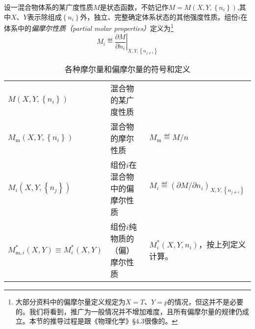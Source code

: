 \documentclass[main.tex]{subfiles}
\begin{document}
设一混合物体系的某广度性质$M$是状态函数，不妨记作$M=M\left(X,Y,\left\{n_i\right\}\right)$,其中$X$、$Y$表示除组成$\left\{n_i\right\}$外，独立、完整确定体系状态的其他强度性质。组份$i$在体系中的\emph{偏摩尔性质（partial molar properties）}定义为\footnote{大部分资料中的偏摩尔量定义规定为$X=T$、$Y=p$的情况，但这并不是必要的。我们将看到，推广为一般情况并不增加难度，且所有偏摩尔量的规律仍成立。本节的推导过程是跟《物理化学》\S4.3很像的。}
\[M_i\eqdef\left.\frac{\partial M}{\partial n_i}\right|_{X,Y,\left\{n_{j\neq i}\right\}}\]

\begin{longtable}{p{}p{}p{}}
  \caption{各种摩尔量和偏摩尔量的符号和定义}\label{tab:molar_partial_molar_notaion}                                                                                                    \\
  \hline
  $M\left(X,Y,\left\{n_i\right\}\right)$                         & 混合物的某广度性质        &                                                                                  \\
  $M_\text{m}\left(X,Y,\left\{n_i\right\}\right)$                & 混合物的摩尔性质         & $M_\text{m}\eqdef M/n$                                                           \\
  $M_i\left(X,Y,\left\{n_j\right\}\right)$                       & 组份$i$在混合物中的偏摩尔性质 & $M_i\eqdef\left(\partial M/\partial n_i\right)_{X,Y,\left\{n_{j\neq i}\right\}}$ \\
  $M_{\text{m},i}^*\left(X,Y\right)\equiv M_i^*\left(X,Y\right)$ & 组份$i$纯物质的（偏）摩尔性质 & $M_i^*\left(X,Y,n_i\right)$，按上列定义计算。                                             \\
  \hline
\end{longtable}
\end{document}
